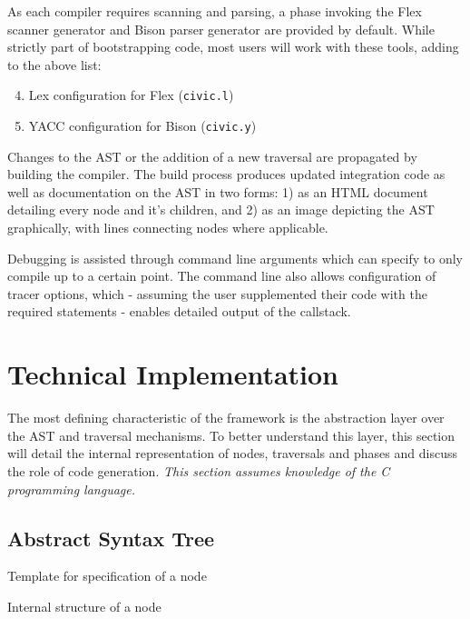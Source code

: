 \documentclass[twoside,openright]{uva-bachelor-thesis}
\newcommand{\code}[1]{\texttt{\footnotesize#1}}
\begin{document}
		As each compiler requires scanning and parsing, a phase invoking the Flex scanner generator and Bison parser generator are provided by default. While strictly part of bootstrapping code, most users will work with these tools, adding to the above list:
		\begin{enumerate}
			\setcounter{enumi}{3}
			\item Lex configuration for Flex (\code{civic.l})
			\item YACC configuration for Bison (\code{civic.y})
		\end{enumerate}
		
		Changes to the AST or the addition of a new traversal are propagated by building the compiler. The build process produces updated integration code as well as documentation on the AST in two forms: 1) as an HTML document detailing every node and it's children, and 2) as an image depicting the AST graphically, with lines connecting nodes where applicable.
		
		Debugging is assisted through command line arguments which can specify to only compile up to a certain point. The command line also allows configuration of tracer options, which - assuming the user supplemented their code with the required statements - enables detailed output of the callstack.
	
		
	\section{Technical Implementation}
		The most defining characteristic of the framework is the abstraction layer over the AST and traversal mechanisms. To better understand this layer, this section will detail the internal representation of nodes, traversals and phases and discuss the role of code generation. \emph{This section assumes knowledge of the C programming language.}
				
		\subsection{Abstract Syntax Tree}
		\label{c-ast}
			\begin{codebox}[label=xml-node-structure]{Template for specification of a node}
			\end{codebox}
			
			\begin{codebox}[label=c-node-structure]{Internal structure of a node}
			\end{codebox}
			
\end{document}
